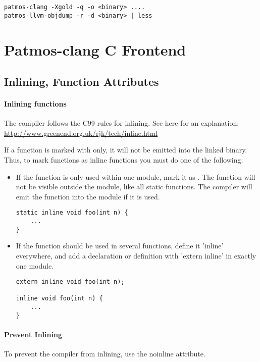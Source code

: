 \begin{verbatim}
patmos-clang -Xgold -q -o <binary> ....
patmos-llvm-objdump -r -d <binary> | less
\end{verbatim}




\section{Patmos-clang C Frontend}
\label{sec:toolchain:frontend}

\subsection{Inlining, Function Attributes}

\paragraph{Inlining functions}
The compiler follows the C99 rules for inlining. See here for an explanation:
%
\url{http://www.greenend.org.uk/rjk/tech/inline.html}

If a function is marked with  only, it will not be emitted into the linked binary.
Thus, to mark functions as inline functions you must do one of the following:

\begin{itemize}
\item If the function is only used within one module, mark it as .
The function will not be visible outside the module, like all static functions. The compiler will emit the 
function into the module if it is used.

\begin{verbatim}
static inline void foo(int n) {
    ...
}
\end{verbatim}

\item If the function should be used in several functions, define it 'inline' everywhere,
  and add a declaration or definition with 'extern inline' in exactly one module.

\begin{verbatim}
extern inline void foo(int n);

inline void foo(int n) {
    ...
}
\end{verbatim}
\end{itemize}

\paragraph{Prevent Inlining}
To prevent the compiler from inlining, use the noinline attribute.

